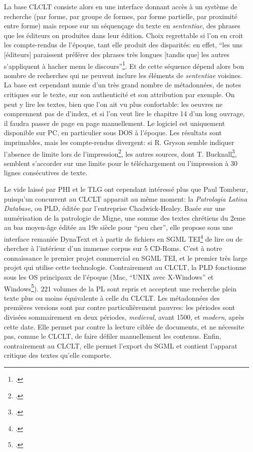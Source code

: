 La base CLCLT consiste alors en une interface donnant accès à un système de recherche (par forme, par groupe de formes, par forme partielle, par proximité entre forme) mais repose sur un séquençage du texte en \textit{sententiae}, des phrases que les éditeurs on produites dans leur édition. Choix regrettable si l'on en croit les compte-rendus de l'époque, tant elle produit des disparités: en effet, \enquote{les uns {[éditeurs]} paraissent préférer des phrases très longues {[tandis que]} les autres s'appliquent à hacher menu le discours}\footcite{gryson_nouvelle_1992}. Et de cette séquence dépend alors bon nombre de recherches qui ne peuvent inclure les éléments de \textit{sententiae} voisines. La base est cependant munie d'un très grand nombre de métadonnées, de notes critiques sur le texte, sur son authenticité et son attribution par exemple. On peut y lire les textes, bien que l'on ait vu plus confortable: les oeuvres ne comprennent pas de d'index, et si l'on veut lire le chapitre 14 d'un long ouvrage, il faudra passer de page en page manuellement. Le logiciel est uniquement disponible sur PC, en particulier sous DOS à l'époque. Les résultats sont imprimables, mais les compte-rendus divergent: si R. Gryson semble indiquer l'absence de limite lors de l'impression\footcite[p. 421]{gryson_nouvelle_1992}, les autres sources, dont T. Bucknall\footcite[p. 94]{bucknall_review_1994}, semblent s'accorder sur une limite pour le téléchargement ou l'impression à 30 lignes consécutives de texte.

Le vide laissé par PHI et le TLG ont cependant intéressé plus que Paul Tombeur, puisqu'un concurrent au CLCLT apparait au même moment: la \textit{Patrologia Latina Database}, ou PLD, éditée par l'entreprise Chadwick-Healey. Basée sur une numérisation de la patrologie de Migne, une somme des textes chrétiens du 2eme au bas moyen-âge éditée au 19e siècle pour \enquote{peu cher}, elle propose sous une interface remaniée DynaText et à partir de fichiers en SGML TEI\footcite{smith_dynatext_1993} de lire ou de chercher à l'intérieur d'un immense corpus sur 5 CD-Roms. C'est à notre connaissance le premier projet commercial en SGML TEI, et le premier très large projet qui utilise cette technologie. Contrairement au CLCLT, la PLD fonctionne sous les OS principaux de l'époque (Mac, \enquote{UNIX avec X-Windows} et Windows\footcite{smith_dynatext_1993}). 221 volumes de la PL sont repris et acceptent une recherche plein texte plus ou moins équivalente à celle du CLCLT. Les métadonnées des premières versions sont par contre particulièrement pauvres: les périodes sont divisées sommairement en deux périodes, \textit{medieval}, avant 1500, et \textit{modern}, après cette date. Elle permet par contre la lecture ciblée de documents, et ne nécessite pas, comme le CLCLT, de faire défiler manuellement les contenus. Enfin, contrairement au CLCLT, elle permet l'export du SGML et contient l'apparat critique des textes qu'elle comporte.

